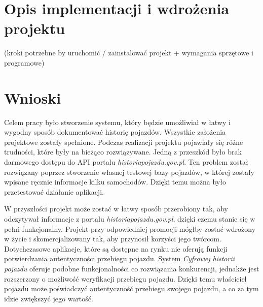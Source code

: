 \documentclass[12pt]{article}
\begin{document}
\newpage
\section{Opis implementacji i wdrożenia projektu}
(kroki potrzebne by uruchomić / zainstalować projekt + wymagania sprzętowe i programowe)


\newpage
\section{Wnioski}

Celem pracy było stworzenie systemu, który będzie umożliwiał w łatwy i wygodny sposób dokumentować historię pojazdów. Wszystkie założenia projektowe zostały spełnione. Podczas realizacji projektu pojawiały się różne trudności, które były na bieżąco rozwiązywane. Jedną z przeszkód było brak darmowego dostępu do API portalu \textit{historiapojazdu.gov.pl}. Ten problem został rozwiązany poprzez stworzenie własnej testowej bazy pojazdów, w której zostały wpisane ręcznie informacje kilku samochodów. Dzięki temu można było przetestować działanie aplikacji.

W przyszłości projekt może zostać w łatwy sposób przerobiony tak, aby odczytywał informacje z portalu \textit{historiapojazdu.gov.pl}, dzięki czemu stanie się w pełni funkcjonalny. Projekt przy odpowiedniej promocji mógłby zostać wdrożony w życie i skomercjalizowany tak, aby przynosił korzyści jego twórcom. Dotychczasowe aplikacje, które są dostępne na rynku nie oferują funkcji potwierdzania autentyczności przebiegu pojazdu. System \textit{Cyfrowej historii pojazdu} oferuje podobne funkcjonalności co rozwiązania konkurencji, jednakże jest rozszerzony o możliwość weryfikacji przebiegu pojazdu. Dzięki temu właściciel pojazdu może poświadczyć autentyczność przebiegu swojego pojazdu, a co za tym idzie zwiększyć jego wartość.
\end{document}
